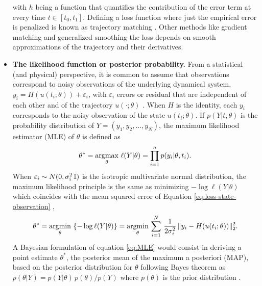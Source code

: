 \begin{itemize}
\begin{equation}
         \label{eq:integrated-loss-function}
    \end{equation}
    with $h$ being a function that quantifies the contribution of the error term at every time $t \in [t_0, t_1]$. 
    Defining a loss function where just the empirical error is penalized is known as trajectory matching \cite{ramsay2017dynamic}. 
    Other methods like gradient matching and generalized smoothing the loss depends on smooth approximations of the trajectory and their derivatives. 
    \item \textbf{The likelihood function or posterior probability.} From a statistical (and physical) perspective, it is common to assume that observations correspond to noisy observations of the underlying dynamical system, $y_i = H(u(t_i; \theta)) + \varepsilon_i$, with $\varepsilon_i$ errors or residual that are independent of each other and of the trajectory $u(\cdot ; \theta)$ \cite{ramsay2017dynamic}.
    When $H$ is the identity, each $y_i$ corresponds to the noisy observation of the state $u(t_i; \theta)$.
    If $p(Y | t , \theta)$ is the probability distribution of $Y=(y_1, y_2, \ldots, y_N)$, 
    the maximum likelihood estimator (MLE) of $\theta$ is defined as 
    \begin{equation}
        \theta^* 
        = 
        \underset{\theta}{\text{argmax}} \,\, \ell (Y | \theta) 
        = 
        \prod_{i=1}^n p(y_i | \theta, t_i) .
    \end{equation}
    When $\varepsilon_i \sim N(0, \sigma_i^2 \operatorname{\mathbb{I}})$ is the isotropic multivariate normal distribution, the maximum likelihood principle is the same as minimizing $- \log \ell(Y | \theta)$ which coincides with the mean squared error of Equation \eqref{eq:loss-state-observation} \cite{hastie2009elements},
    \begin{equation}
        \theta^* 
        = 
        \underset{\theta}{\text{argmin}} \, \left \{ - \log \ell (Y | \theta) \right \}
        = 
        \underset{\theta}{\text{argmin}} \, \sum_{i=1}^N 
        \, \frac{1}{2\sigma_i^2} \,
        \| y_i - H(u(t_i; \theta)) \|_2^2 .
        \label{eq:MLE}
    \end{equation}
    A Bayesian formulation of equation \eqref{eq:MLE} would consist in deriving a point estimate $\theta^*$, the posterior mean of the maximum a posteriori (MAP), based on the posterior distribution for $\theta$ following Bayes theorem as $p(\theta | Y) = {p(Y | \theta) \, p (\theta)}/{p(Y)}$ where $p(\theta)$ is the prior distribution \cite{pml1Book}.

\end{itemize}
